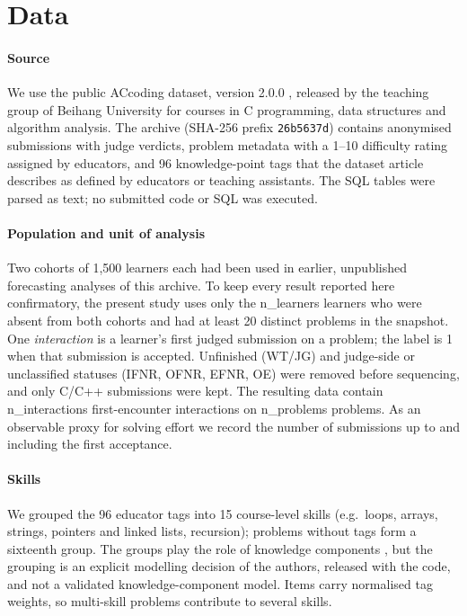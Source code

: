 \section{Data}\label{sec:data}

\paragraph{Source} We use the public ACcoding dataset, version 2.0.0 \citep{chen2024accoding,sun2026accodingdata}, released by the teaching group of Beihang University for courses in C programming, data structures and algorithm analysis. The archive (SHA-256 prefix \texttt{26b5637d}) contains anonymised submissions with judge verdicts, problem metadata with a 1--10 difficulty rating assigned by educators, and 96 knowledge-point tags that the dataset article describes as defined by educators or teaching assistants. The SQL tables were parsed as text; no submitted code or SQL was executed.

\paragraph{Population and unit of analysis} Two cohorts of 1,500 learners each had been used in earlier, unpublished forecasting analyses of this archive. To keep every result reported here confirmatory, the present study uses only the {{n_learners}} learners who were absent from both cohorts and had at least 20 distinct problems in the snapshot. One \emph{interaction} is a learner's first judged submission on a problem; the label is 1 when that submission is accepted. Unfinished (WT/JG) and judge-side or unclassified statuses (IFNR, OFNR, EFNR, OE) were removed before sequencing, and only C/C++ submissions were kept. The resulting data contain {{n_interactions}} first-encounter interactions on {{n_problems}} problems. As an observable proxy for solving effort we record the number of submissions up to and including the first acceptance.

\paragraph{Skills} We grouped the 96 educator tags into 15 course-level skills (e.g.\ loops, arrays, strings, pointers and linked lists, recursion); problems without tags form a sixteenth group. The groups play the role of knowledge components \citep{koedinger2012kli}, but the grouping is an explicit modelling decision of the authors, released with the code, and not a validated knowledge-component model. Items carry normalised tag weights, so multi-skill problems contribute to several skills.

